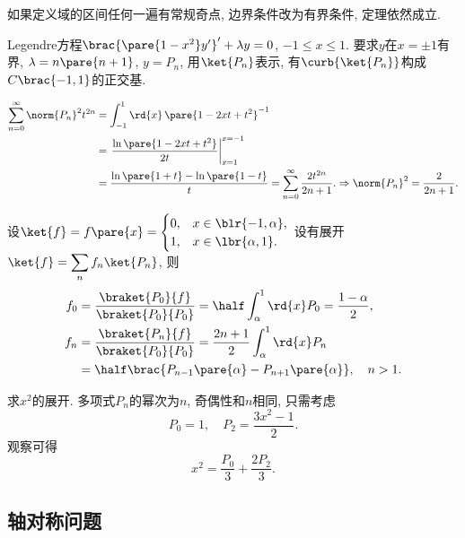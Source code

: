 \documentclass[hidelinks]{ctexart}
\begin{document}
\newpoint{}如果定义域的区间任何一遍有常规奇点, 边界条件改为有界条件, 定理依然成立.
\begin{ex}
    Legendre方程$\brac{\pare{1-x^2}y'}' + \lambda y = 0$, $-1\le x\le 1$. 要求$y$在$x=\pm 1$有界, $\lambda = n\pare{n+1}$, $y=P_n$, 用$\ket{P_n}$表示, 有$\curb{\ket{P_n}}$构成$C\brac{-1,1}$的正交基.
\end{ex}
\begin{align*}
    \sum_{n=0}^\infty \norm{P_n}^2 t^{2n} &= \int_{-1}^1\rd{x}\,\pare{1-2xt+t^2}^{-1}\\
    &= \left.\frac{\ln \pare{1-2xt+t^2}}{2t}\right\vert^{x=-1}_{x=1} \\
    &= \frac{\ln \pare{1+t} - \ln\pare{1-t}}{t} = \sum_{n=0}^\infty \frac{2t^{2n}}{2n+1}.
    \Rightarrow \norm{P_n}^2 = \frac{2}{2n+1}.
\end{align*}
\begin{sample}
    \begin{ex}
        设$\displaystyle \ket{f} = f\pare{x} = \begin{cases}
            0, & x\in \blr{-1,\alpha}, \\
            1, & x\in \lbr{\alpha,1}.
        \end{cases}$ 设有展开$\ket{f} = \displaystyle \sum_n f_n\ket{P_n}$, 则
        \begin{align*}
            f_0 &= \frac{\braket{P_0}{f}}{\braket{P_0}{P_0}} = \half \int_\alpha^1 \rd{x}P_0 = \frac{1-\alpha}{2}, \\
            f_n &= \frac{\braket{P_n}{f}}{\braket{P_0}{P_0}} = \frac{2n+1}{2}\int_\alpha^1\rd{x}P_n \\
            &= \half \brac{P_{n-1}\pare{\alpha} - P_{n+1}\pare{\alpha}},\quad n>1.
        \end{align*}
    \end{ex}
\end{sample}
\begin{sample}
    \begin{ex}
        求$x^2$的展开. 多项式$P_n$的幂次为$n$, 奇偶性和$n$相同, 只需考虑
        \[ P_0 = 1,\quad P_2 = \frac{3x^2-1}{2}. \]
        观察可得
        \[ x^2 = \frac{P_0}{3} + \frac{2P_2}{3}. \]
    \end{ex}
\end{sample}


\subsection{轴对称问题} %
\label{sub:轴对称问题}
\end{document}
